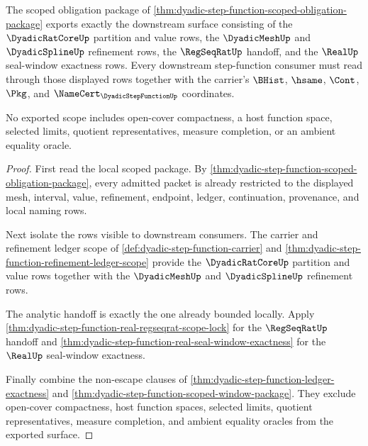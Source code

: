 \begin{theorem}\label{thm:dyadicstepfunction-scope-export}
The scoped obligation package of \autoref{thm:dyadic-step-function-scoped-obligation-package} exports exactly the downstream surface consisting of the $\DyadicRatCoreUp$ partition and value rows, the $\DyadicMeshUp$ and $\DyadicSplineUp$ refinement rows, the $\RegSeqRatUp$ handoff, and the $\RealUp$ seal-window exactness rows. Every downstream step-function consumer must read through those displayed rows together with the carrier's $\BHist$, $\hsame$, $\Cont$, $\Pkg$, and $\NameCert_{\DyadicStepFunctionUp}$ coordinates.

No exported scope includes open-cover compactness, a host function space, selected limits, quotient representatives, measure completion, or an ambient equality oracle.
\end{theorem}
\begin{proof}
First read the local scoped package. By \autoref{thm:dyadic-step-function-scoped-obligation-package}, every admitted packet is already restricted to the displayed mesh, interval, value, refinement, endpoint, ledger, continuation, provenance, and local naming rows.

Next isolate the rows visible to downstream consumers. The carrier and refinement ledger scope of \autoref{def:dyadic-step-function-carrier} and \autoref{thm:dyadic-step-function-refinement-ledger-scope} provide the $\DyadicRatCoreUp$ partition and value rows together with the $\DyadicMeshUp$ and $\DyadicSplineUp$ refinement rows.

The analytic handoff is exactly the one already bounded locally. Apply \autoref{thm:dyadic-step-function-real-regseqrat-scope-lock} for the $\RegSeqRatUp$ handoff and \autoref{thm:dyadic-step-function-real-seal-window-exactness} for the $\RealUp$ seal-window exactness.

Finally combine the non-escape clauses of \autoref{thm:dyadic-step-function-ledger-exactness} and \autoref{thm:dyadic-step-function-scoped-window-package}. They exclude open-cover compactness, host function spaces, selected limits, quotient representatives, measure completion, and ambient equality oracles from the exported surface.
\end{proof}

